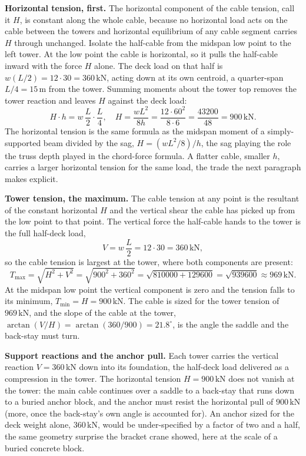 

\textbf{Horizontal tension, first.} The horizontal component of the cable
tension, call it $H$, is constant along the whole cable, because no
horizontal load acts on the cable between the towers and horizontal
equilibrium of any cable segment carries $H$ through unchanged. Isolate the
half-cable from the midspan low point to the left tower. At the low point
the cable is horizontal, so it pulls the half-cable inward with the force
$H$ alone. The deck load on that half is $w(L/2) = 12 \cdot 30 =
360\,\text{kN}$, acting down at its own centroid, a quarter-span
$L/4 = 15\,\si{\meter}$ from the tower. Summing moments about the tower top
removes the tower reaction and leaves $H$ against the deck load:
\[
H \cdot h = w\,\frac{L}{2}\cdot \frac{L}{4}, \quad
H = \frac{w L^2}{8 h} = \frac{12 \cdot 60^2}{8 \cdot 6}
= \frac{43200}{48} = 900\,\text{kN}.
\]
The horizontal tension is the same formula as the midspan moment of a
simply-supported beam divided by the sag, $H = (wL^2/8)/h$, the sag playing
the role the truss depth played in the chord-force formula. A flatter cable,
smaller $h$, carries a larger horizontal tension for the same load, the
trade the next paragraph makes explicit.

\textbf{Tower tension, the maximum.} The cable tension at any point is the
resultant of the constant horizontal $H$ and the vertical shear the cable
has picked up from the low point to that point. The vertical force the
half-cable hands to the tower is the full half-deck load,
\[
V = w\,\frac{L}{2} = 12 \cdot 30 = 360\,\text{kN},
\]
so the cable tension is largest at the tower, where both components are
present:
\[
T_{\max} = \sqrt{H^2 + V^2} = \sqrt{900^2 + 360^2}
= \sqrt{810000 + 129600} = \sqrt{939600} \approx 969\,\text{kN}.
\]
At the midspan low point the vertical component is zero and the tension
falls to its minimum, $T_{\min} = H = 900\,\text{kN}$. The cable is sized
for the tower tension of $969\,\text{kN}$, and the slope of the cable at the
tower, $\arctan(V/H) = \arctan(360/900) = 21.8^{\circ}$, is the angle the
saddle and the back-stay must turn.

\textbf{Support reactions and the anchor pull.} Each tower carries the
vertical reaction $V = 360\,\text{kN}$ down into its foundation, the
half-deck load delivered as a compression in the tower. The horizontal
tension $H = 900\,\text{kN}$ does not vanish at the tower: the main cable
continues over a saddle to a back-stay that runs down to a buried anchor
block, and the anchor must resist the horizontal pull of $900\,\text{kN}$
(more, once the back-stay's own angle is accounted for). An anchor sized for
the deck weight alone, $360\,\text{kN}$, would be under-specified by a
factor of two and a half, the same geometry surprise the bracket crane
showed, here at the scale of a buried concrete block.

